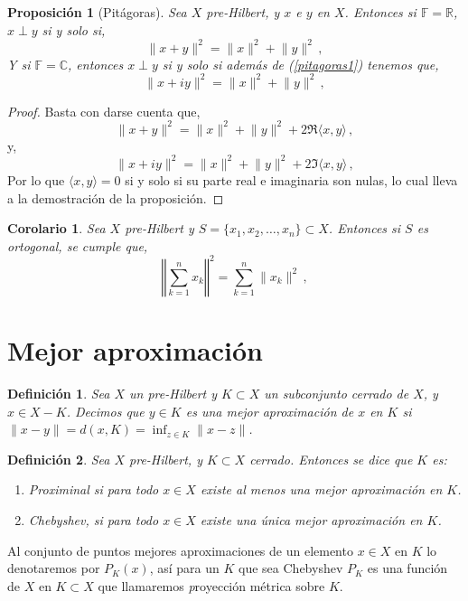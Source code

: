 \documentclass[12pt]{book}
\newtheorem{defn}{\bf Definición}[chapter]
\newtheorem{prop}{\bf Proposición}[chapter]
\newtheorem{coro}{Corolario}[chapter]
\def\RR{\mathbb{R}}
\def\CC{\mathbb{C}}
\def\FF{\mathbb{F}}
\newcommand{\norm}[1]{\lVert #1\rVert }
\newcommand{\lin}[1]{\langle #1 \rangle}
\newcommand{\Norm}[1]{\left\Vert #1\right\Vert }
\begin{document}
\begin{prop}[Pitágoras] Sea $X$ pre-Hilbert, y $x$ e $y$ en $X$. Entonces  si $\FF=\RR$,  $x\perp y$ si y solo  si,
\begin{equation}
\norm{x+y}^2=\norm{x}^2+\norm{y}^2\,,\label{pitagoras1}
\end{equation}
Y si $\FF=\CC$, entonces $x\perp y$ si y solo si además de (\ref{pitagoras1}) tenemos que,
\begin{equation}\norm{x + iy}^2=\norm{x}^2+\norm{y}^2\,,\label{pitagoras2}
\end{equation}
\end{prop}
\begin{proof}
Basta con darse cuenta que,
$$\norm{x+y}^2=\norm{x}^2+\norm{y}^2+2\Re\lin{x,y}\,,$$
y,
$$\norm{x+iy}^2=\norm{x}^2+\norm{y}^2+2\Im\lin{x,y}\,,$$
Por lo que $\lin{x,y}=0$ si y solo si su parte real e imaginaria son nulas, lo cual lleva  a la demostración de la proposición.
\end{proof}

\begin{coro}
Sea $X$ pre-Hilbert y $S=\{x_1,x_2,\dots,x_n\}\subset X$. Entonces si  $S$ es ortogonal, se cumple que,
\begin{equation}
\Norm{\sum_{k=1}^n x_k}^2=\sum_{k=1}^n \norm{x_k}^2\,,\label{pitagorasGeneral}
\end{equation}
\end{coro}
 \section{Mejor aproximación}
 \begin{defn} Sea $X$ un pre-Hilbert y $K\subset X$ un subconjunto cerrado de $X$, y $x\in X-K$. Decimos que $y\in K$ es una mejor aproximación de $x$ en $K$ si $\norm{x-y}=d(x,K)=\inf_{z\in K}\norm{x-z}$.
\end{defn}
\begin{defn} Sea $X$ pre-Hilbert, y $K\subset X$ cerrado. Entonces se dice que $K$ es:
\begin{enumerate}
\item {\emph Proximinal} si para todo $x\in X$ existe al menos una mejor aproximación en $K$.
\item {\emph Chebyshev}, si para todo $x\in X$ existe una única mejor aproximación en $K$.
\end{enumerate}
\end{defn}
Al conjunto de puntos mejores aproximaciones de un elemento $x\in X$ en $K$  lo denotaremos por $P_K(x)$, así para un $K$  que sea Chebyshev $P_K$ es una función de $X$ en $K\subset X$ que llamaremos {\emph proyección métrica} sobre $K$.
  
\end{document}
